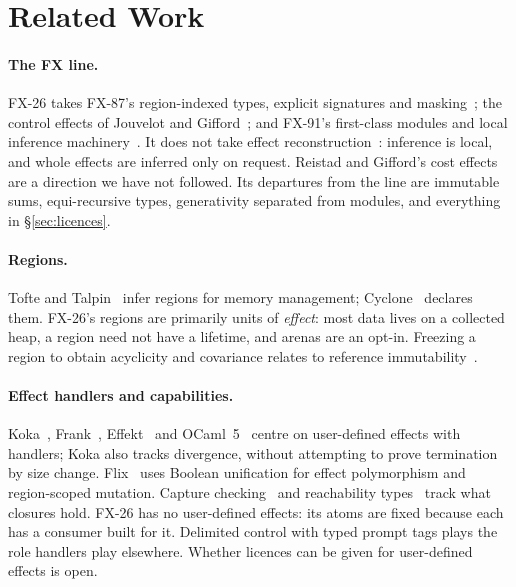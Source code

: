 \documentclass[acmsmall,screen,review]{acmart}
\newcommand{\fx}{FX-26}
\begin{document}
\section{Related Work}
\label{sec:related}

\paragraph{The FX line.} \fx{} takes FX-87's region-indexed types,
explicit signatures and masking~\cite{fx87,lucassen-gifford,lucassen-thesis};
the control effects of Jouvelot and Gifford~\cite{jouvelot-gifford};
and FX-91's first-class modules and local inference
machinery~\cite{fx91,sheldon-gifford}. It does not take effect
reconstruction~\cite{jouvelot-gifford-reconstruction,talpin-jouvelot}:
inference is local, and whole effects are inferred only on request.
Reistad and Gifford's cost effects~\cite{reistad-gifford} are a
direction we have not followed. Its departures from the line are
immutable sums, equi-recursive types, generativity separated from
modules, and everything in \S\ref{sec:licences}.

\paragraph{Regions.} Tofte and Talpin~\cite{tofte-talpin} infer
regions for memory management; Cyclone~\cite{cyclone} declares them.
\fx's regions are primarily units of \emph{effect}: most data lives on
a collected heap, a region need not have a lifetime, and arenas are an
opt-in. Freezing a region to obtain acyclicity and covariance relates
to reference immutability~\cite{gordon-uniqueness}.

\paragraph{Effect handlers and capabilities.} Koka~\cite{koka},
Frank~\cite{frank}, Effekt~\cite{effekt} and OCaml~5~\cite{ocaml5}
centre on user-defined effects with handlers; Koka also tracks
divergence, without attempting to prove termination by size change.
Flix~\cite{flix} uses Boolean unification for effect polymorphism and
region-scoped mutation. Capture checking~\cite{capturing-types} and
reachability types~\cite{reachability} track what closures hold. \fx{}
has no user-defined effects: its atoms are fixed because each has a
consumer built for it. Delimited control with typed prompt tags plays
the role handlers play elsewhere. Whether licences can be given for
user-defined effects is open.
\end{document}
